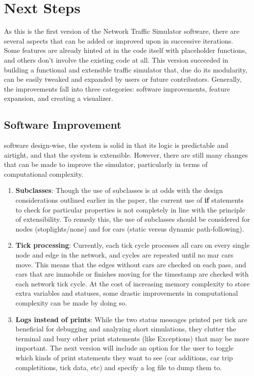\chapter{Next Steps}
\label{Future}

\par As this is the first version of the Network Traffic Simulator software, there are several aspects that can be added or improved upon in successive iterations.  Some features are already hinted at in the code itself with placeholder functions, and others don't involve the existing code at all.  This version succeeded in building a functional and extensible traffic simulator that, due do its modularity, can be easily tweaked and expanded by users or future contributors.  Generally, the improvements fall into three categories:  software improvements, feature expansion, and creating a visualizer.

\section{Software Improvement}

\par software design-wise, the system is solid in that its logic is predictable and airtight, and that the system is extensible.  However, there are still many changes that can be made to improve the simulator, particularly in terms of computational complexity.

\begin{enumerate}
    \item \textbf{Subclasses}:  Though the use of subclasses is at odds with the design considerations outlined earlier in the paper, the current use of \textbf{if} statements to check for particular properties is not completely in line with the principle of extensibility.  To remedy this, the use of subclasses should be considered for nodes (stoplights/none) and for cars (static versus dynamic path-following).
    \item \textbf{Tick processing}:  Currently, each tick cycle processes all cars on every single node and edge in the network, and cycles are repeated until no mar cars move.  This means that the edges without cars are checked on each pass, and cars that are immobile or finishes moving for the timestamp are checked with each network tick cycle.  At the cost of increasing memory complexity to store extra variables and statuses, some drastic improvements in computational complexity can be made by doing so.
    \item \textbf{Logs instead of prints}:  While the two status messages printed per tick are beneficial for debugging and analyzing short simulations, they clutter the terminal and bury other print statements (like Exceptions) that may be more important.  The next version will include an option for the user to toggle which kinds of print statements they want to see (car additions, car trip completitions, tick data, etc) and specify a log file to dump them to.
\end{enumerate}


